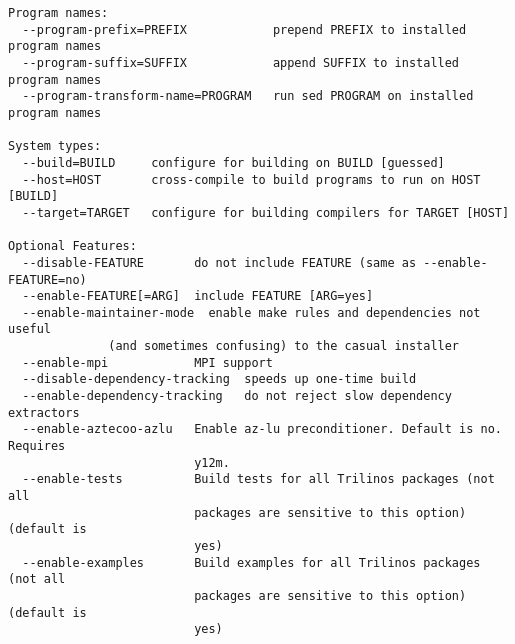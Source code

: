 \begin{Verbatim}
Program names:
  --program-prefix=PREFIX            prepend PREFIX to installed program names
  --program-suffix=SUFFIX            append SUFFIX to installed program names
  --program-transform-name=PROGRAM   run sed PROGRAM on installed program names

System types:
  --build=BUILD     configure for building on BUILD [guessed]
  --host=HOST       cross-compile to build programs to run on HOST [BUILD]
  --target=TARGET   configure for building compilers for TARGET [HOST]

Optional Features:
  --disable-FEATURE       do not include FEATURE (same as --enable-FEATURE=no)
  --enable-FEATURE[=ARG]  include FEATURE [ARG=yes]
  --enable-maintainer-mode  enable make rules and dependencies not useful
			  (and sometimes confusing) to the casual installer
  --enable-mpi            MPI support
  --disable-dependency-tracking  speeds up one-time build
  --enable-dependency-tracking   do not reject slow dependency extractors
  --enable-aztecoo-azlu   Enable az-lu preconditioner. Default is no. Requires
                          y12m.
  --enable-tests          Build tests for all Trilinos packages (not all
                          packages are sensitive to this option) (default is
                          yes)
  --enable-examples       Build examples for all Trilinos packages (not all
                          packages are sensitive to this option) (default is
                          yes)


\end{Verbatim}
